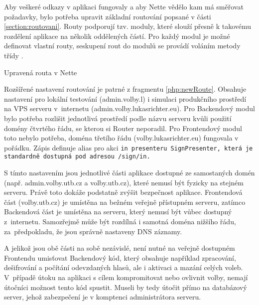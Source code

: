 Aby veškeré odkazy v aplikaci fungovaly a aby Nette vědělo kam má směřovat požadavky, bylo potřeba upravit základní routování popsané v části \ref{section:routovani}. Routy podporují tzv. moduly, které slouží přesně k takovému rozdělení aplikace na několik oddělených částí. Pro každý modul je možné definovat vlastní routy, seskupení rout do modulů se provádí voláním metody  %
třídy . 

\begin{listing}[ht]
\caption{Upravená routa v Nette}
\label{php:newRoute}
\end{listing}

Rozšířené nastavení routování je patrné z fragmentu \ref{php:newRoute}. Obsahuje nastavení pro lokální testování (admin.volby.l) i simulaci produkčního prostředí na VPS serveru v~internetu (admin.volby.lukasrichter.eu). Pro Backendový modul bylo potřeba rozlišit jednotlivá prostředí podle názvu serveru kvůli použití domény čtvrtého řádu, se kterou si Router neporadil. Pro Frontendový modul toto nebylo potřeba, doména třetího řádu (volby.lukasrichter.eu) fungovala v pořádku. Zápis  definuje alias pro akci \tt{in} presenteru \tt{SignPresenter}, která je standardně dostupná pod adresou \tt{/sign/in}.

S tímto nastavením jsou jednotlivé části aplikace dostupné ze samostaných domén (např. admin.volby.utb.cz a volby.utb.cz), které nemusí být fyzicky na stejném serveru. Právě toto dokáže podstatně zvýšit bezpečnost aplikace. Frontendová část (volby.utb.cz) je umístěna na bežném veřejně přístupném serveru, zatímco Backendová část je umístěna na serveru, který nemusí být vůbec dostupný z~internetu. Samozřejmě může být rozdílná i samotná doména nižšího řádu, za~předpokladu, že jsou správně nastaveny DNS záznamy.

A jelikož jsou obě části na sobě nezávislé, není nutné na veřejně dostupném Frontendu umisťovat Backendový kód, který obsahuje například zpracování, dešifrování a počítání odevzdaných hlasů, ale i aktivaci a mazání celých voleb. V~případě útoku na aplikaci s cílem kompromitovat nebo ovlivnit volby, nemají útočníci možnost tento kód spustit. Museli by tedy útočit přímo na databázový server, jehož zabezpečení je v komptenci administrátora serveru.